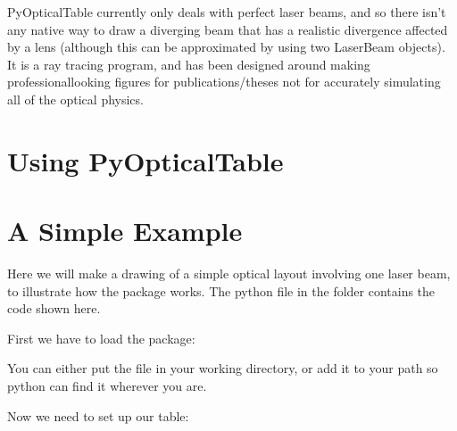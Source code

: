 \documentclass[letterpaper,10pt,english]{sphinxmanual}
\begin{document}
\sphinxAtStartPar
PyOpticalTable currently only deals with perfect laser beams, and so there isn’t any native way to draw a diverging beam that has a realistic divergence affected by a lens (although this can be approximated by using two LaserBeam objects). It is  a ray tracing program, and has been designed around making professional\sphinxhyphen{}looking figures for publications/theses \sphinxhyphen{} not for accurately simulating all of the optical physics.


\chapter{Using PyOpticalTable}
\label{\detokenize{index:using-pyopticaltable}}

\chapter{A Simple Example}
\label{\detokenize{index:a-simple-example}}
\sphinxAtStartPar
Here we will make a drawing of a simple optical layout involving one laser beam, to illustrate how the package works. The python file  in the  folder contains the code shown here.

\sphinxAtStartPar
First we have to load the package:

\begin{sphinxVerbatim}[commandchars=\\\{\}]
   
\end{sphinxVerbatim}

\sphinxAtStartPar
You can either put the file  in your working directory, or add it to your path so python can find it wherever you are.

\sphinxAtStartPar
Now we need to set up our table:

\begin{sphinxVerbatim}[commandchars=\\\{\}]
      
\end{sphinxVerbatim}
\end{document}
